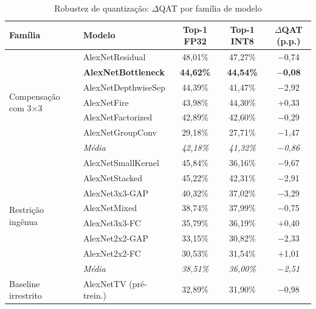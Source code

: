 \documentclass[conference]{IEEEtran}
\begin{document}
\begin{table}[!t]
\caption{Robustez de quantização: $\Delta$QAT por família de modelo}
\label{tab:quantization_robustness}
\centering
\small
\begin{tabular}{@{}llccc@{}}
\toprule
\textbf{Família} & \textbf{Modelo} & \textbf{Top-1 FP32} & \textbf{Top-1 INT8} & \textbf{$\Delta$QAT (p.p.)} \\
\midrule
\multirow{7}{*}{Compensação com 3$\times$3} & AlexNetResidual & 48,01\% & 47,27\% & $-$0,74 \\
& \textbf{AlexNetBottleneck} & \textbf{44,62\%} & \textbf{44,54\%} & \textbf{$-$0,08} \\
& AlexNetDepthwiseSep & 44,39\% & 41,47\% & $-$2,92 \\
& AlexNetFire & 43,98\% & 44,30\% & $+$0,33 \\
& AlexNetFactorized & 42,89\% & 42,60\% & $-$0,29 \\
& AlexNetGroupConv & 29,18\% & 27,71\% & $-$1,47 \\
& \textit{Média} & \textit{42,18\%} & \textit{41,32\%} & \textit{$-$0,86} \\
\midrule
\multirow{8}{*}{Restrição ingênua} & AlexNetSmallKernel & 45,84\% & 36,16\% & $-$9,67 \\
& AlexNetStacked & 45,22\% & 42,31\% & $-$2,91 \\
& AlexNet3x3-GAP & 40,32\% & 37,02\% & $-$3,29 \\
& AlexNetMixed & 38,74\% & 37,99\% & $-$0,75 \\
& AlexNet3x3-FC & 35,79\% & 36,19\% & $+$0,40 \\
& AlexNet2x2-GAP & 33,15\% & 30,82\% & $-$2,33 \\
& AlexNet2x2-FC & 30,53\% & 31,54\% & $+$1,01 \\
& \textit{Média} & \textit{38,51\%} & \textit{36,00\%} & \textit{$-$2,51} \\
\midrule
Baseline irrestrito & AlexNetTV (pré-trein.) & 32,89\% & 31,90\% & $-$0,98 \\
\bottomrule
\end{tabular}
\end{table}
\end{document}
